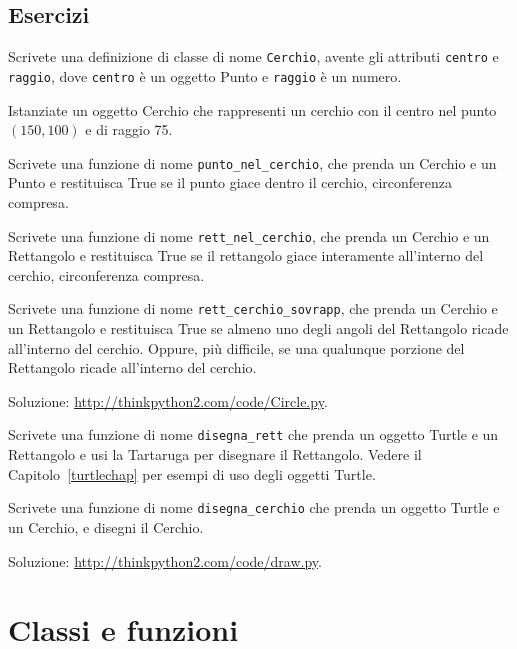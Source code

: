 \documentclass[10pt]{book}
\begin{document}
\section{Esercizi}

\begin{exercise}

Scrivete una definizione di classe di nome {\tt Cerchio}, avente gli attributi
{\tt centro} e {\tt raggio}, dove {\tt centro} è un oggetto Punto e {\tt raggio} è un numero.

Istanziate un oggetto Cerchio che rappresenti un cerchio con il centro nel punto $(150, 100)$ e di raggio 75.

Scrivete una funzione di nome \verb"punto_nel_cerchio", che prenda un Cerchio e un Punto e restituisca True se il punto giace dentro il cerchio, circonferenza compresa.

Scrivete una funzione di nome \verb"rett_nel_cerchio", che prenda un Cerchio e un  Rettangolo e restituisca True se il rettangolo giace interamente all'interno del cerchio, circonferenza compresa.

Scrivete una funzione di nome \verb"rett_cerchio_sovrapp", che prenda un Cerchio e un Rettangolo e restituisca True se almeno uno degli angoli del Rettangolo ricade all'interno del cerchio. Oppure, più difficile, se una qualunque porzione del Rettangolo ricade all'interno del cerchio.

Soluzione: \url{http://thinkpython2.com/code/Circle.py}.

\end{exercise}

\vspace{0.2in}
\begin{exercise}

Scrivete una funzione di nome \verb"disegna_rett" che prenda un oggetto Turtle e
un Rettangolo e usi la Tartaruga per disegnare il Rettangolo.  Vedere il
Capitolo~\ref{turtlechap} per esempi di uso degli oggetti Turtle.

Scrivete una funzione di nome \verb"disegna_cerchio" che prenda un oggetto Turtle e un Cerchio, e disegni il Cerchio.

Soluzione: \url{http://thinkpython2.com/code/draw.py}.

\end{exercise}



\chapter{Classi e funzioni}
\label{time}
\end{document}
